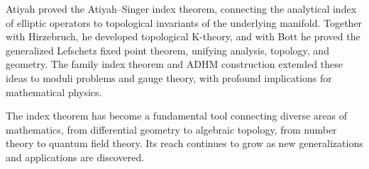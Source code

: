 Atiyah proved the Atiyah--Singer index theorem, connecting the analytical index
of elliptic operators to topological invariants of the underlying manifold.
Together with Hirzebruch, he developed topological K-theory, and with Bott he
proved the generalized Lefschetz fixed point theorem, unifying analysis,
topology, and geometry. The family index theorem and ADHM construction extended
these ideas to moduli problems and gauge theory, with profound implications for
mathematical physics.

The index theorem has become a fundamental tool connecting diverse areas of
mathematics, from differential geometry to algebraic topology, from number
theory to quantum field theory. Its reach continues to grow as new
generalizations and applications are discovered.
